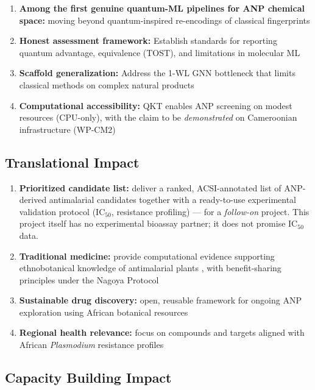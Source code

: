 \documentclass[11pt,a4paper]{article}
\begin{document}
\begin{enumerate}
    \item \textbf{Among the first genuine quantum-ML pipelines for ANP chemical space:} moving beyond quantum-inspired re-encodings of classical fingerprints \cite{havlicek2019,boy2025}
    \item \textbf{Honest assessment framework:} Establish standards for reporting quantum advantage, equivalence (TOST), and limitations in molecular ML \cite{lakens2017}
    \item \textbf{Scaffold generalization:} Address the 1-WL GNN bottleneck that limits classical methods on complex natural products \cite{morris2019}
    \item \textbf{Computational accessibility:} QKT enables ANP screening on modest resources (CPU-only), with the claim to be \textit{demonstrated} on Cameroonian infrastructure (WP-CM2)
\end{enumerate}

\subsection{Translational Impact}

\begin{enumerate}
    \item \textbf{Prioritized candidate list:} deliver a ranked, ACSI-annotated list of ANP-derived antimalarial candidates together with a ready-to-use experimental validation protocol (IC$_{50}$, resistance profiling) --- for a \textit{follow-on} project. This project itself has no experimental bioassay partner; it does not promise IC$_{50}$ data.
    \item \textbf{Traditional medicine:} provide computational evidence supporting ethnobotanical knowledge of antimalarial plants \cite{bero2009}, with benefit-sharing principles under the Nagoya Protocol \cite{nagoya2011}
    \item \textbf{Sustainable drug discovery:} open, reusable framework for ongoing ANP exploration using African botanical resources
    \item \textbf{Regional health relevance:} focus on compounds and targets aligned with African \textit{Plasmodium} resistance profiles
\end{enumerate}

\subsection{Capacity Building Impact}
\end{document}
